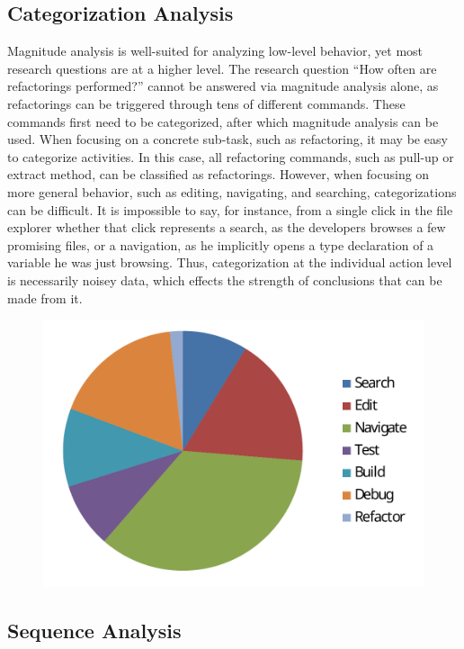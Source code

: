 \subsection{Categorization Analysis}

Magnitude analysis is well-suited for analyzing low-level behavior, yet most research questions are at a higher level. The research question ``How often are refactorings performed?'' cannot be answered via magnitude analysis alone, as refactorings can be triggered through tens of different commands. These commands first need to be categorized, after which magnitude analysis can be used. When focusing on a concrete sub-task, such as refactoring, it may be easy to categorize activities. In this case, all refactoring commands, such as pull-up or extract method, can be classified as refactorings. However, when focusing on more general behavior, such as editing, navigating, and searching, categorizations can be difficult. It is impossible to say, for instance, from a single click in the file explorer whether that click represents a search, as the developers browses a few promising files, or a navigation, as he implicitly opens a type declaration of a variable he was just browsing. Thus, categorization at the individual action level is necessarily noisey data, which effects the strength of conclusions that can be made from it.

\begin{figure}[t]
 \centering
\includegraphics[width=0.5\columnwidth]{Graphics/activityCategorization.pdf}
\label{fig:category}
\end{figure}


\subsection{Sequence Analysis}

